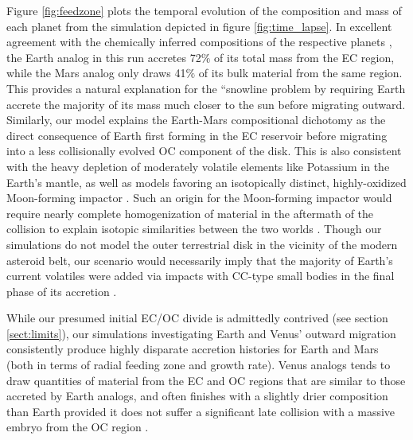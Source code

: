 \documentclass[trackchanges,twocolumn]{aastex}
\begin{document}
Figure \ref{fig:feedzone} plots the temporal evolution of the composition and mass of each planet from the simulation depicted in figure \ref{fig:time_lapse}.  In excellent agreement with the chemically inferred compositions of the respective planets \citep{javoy10,tang14}, the Earth analog in this run accretes 72$\%$ of its total mass from the EC region, while the Mars analog only draws 41$\%$ of its bulk material from the same region.  This provides a natural explanation for the ``snowline problem \citep[see][and references therein]{morby16_ice} by requiring Earth accrete the majority of its mass much closer to the sun before migrating outward.  Similarly, our model explains the Earth-Mars compositional dichotomy as the direct consequence of Earth first forming in the EC reservoir before migrating into a less collisionally evolved OC component of the disk.  This is also consistent with the heavy depletion of moderately volatile elements like Potassium \citep[e.g.:][]{allegre01} in the Earth's mantle, as well as models favoring an isotopically distinct, highly-oxidized Moon-forming impactor \citep[e.g.:][see the final impact on Earth in figure \ref{fig:feedzone}]{schonbaschler10}.  Such an origin for the Moon-forming impactor would require nearly complete homogenization \citep{nimmo10} of material in the aftermath of the collision to explain isotopic similarities between the two worlds \citep[for instance $\Delta ^{17}$O:][]{wiechert01}.  Though our simulations do not model the outer terrestrial disk in the vicinity of the modern asteroid belt, our scenario would necessarily imply that the majority of Earth's current volatiles were added via impacts with CC-type small bodies in the final phase of its accretion \citep[consistent with core-mantle differentiation models:][the former of which argued that accretion changed from mostly reduced to oxidized material after Earth reached $\sim$60$\%$ its present size]{rubie15,dauphas17}.

While our presumed initial EC/OC divide is admittedly contrived (see section \ref{sect:limits}), our simulations investigating Earth and Venus' outward migration consistently produce highly disparate accretion histories for Earth and Mars (both in terms of radial feeding zone and growth rate).  Venus analogs tends to draw quantities of material from the EC and OC regions that are similar to those accreted by Earth analogs, and often finishes with a slightly drier composition than Earth provided it does not suffer a significant late collision with a massive embryo from the OC region \citep[note that Venus' lack of a natural satellite and magnetic field might evidence it having avoided such a late collision analogous to the Moon-forming impact:][]{jacobson17b}.
\end{document}
